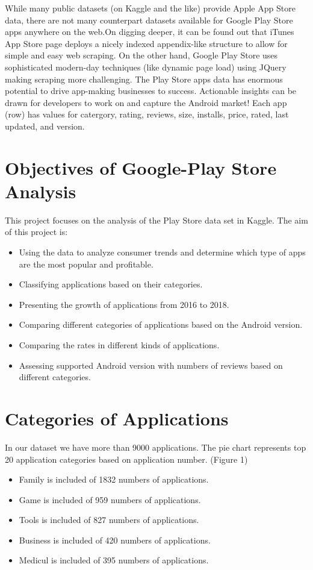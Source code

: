 While many public datasets (on Kaggle and the like) provide Apple App Store data, there are not many counterpart datasets available for Google Play Store apps anywhere on the web.On digging deeper, it can be found out that iTunes App Store page deploys a nicely indexed appendix-like structure to allow for simple and easy web scraping. On the other hand, Google Play Store uses sophisticated modern-day techniques (like dynamic page load) using JQuery making scraping more challenging.
The Play Store apps data has enormous potential to drive app-making businesses to success. Actionable insights can be drawn for developers to work on and capture the Android market!
Each app (row) has values for catergory, rating, reviews, size, installs, price, rated, last updated, and version.


\section*{Objectives of Google-Play Store Analysis}
This project focuses on the analysis of the Play Store data set in Kaggle.
The aim of this project is:
\begin{itemize}
\item Using the data to analyze consumer trends and determine which type of apps are the most popular and profitable.\\
\item Classifying applications based on their categories.\\
\item Presenting the growth of applications from 2016 to 2018.\\
\item Comparing different categories of applications based on the Android version.\\
\item Comparing the rates in different kinds of applications.\\
\item Assessing supported Android version with numbers of reviews based on different categories.\\
\end{itemize}

\section*{Categories of Applications}
In our dataset we have more than 9000 applications. The pie chart represents top 20 application categories based on application number. (Figure 1)
\begin{itemize}
\item
  Family is included of 1832  numbers of applications.
\item
  Game is included of 959  numbers of applications.
  \item
  Tools is included of 827  numbers of applications.
\item
  Business is included of 420  numbers of applications.
\item
  Medicul is included of 395  numbers of applications.
\end{itemize}

